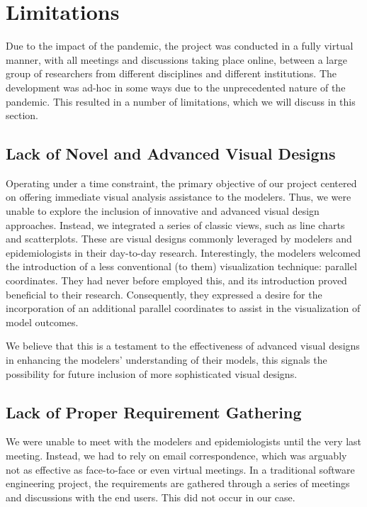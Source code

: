 \section{Limitations}

Due to the impact of the pandemic, the project was conducted in a fully virtual manner, with all meetings and discussions taking place online, between a large group of researchers from different disciplines and different institutions.
The development was ad-hoc in some ways due to the unprecedented nature of the pandemic.
This resulted in a number of limitations, which we will discuss in this section.

\subsection{Lack of Novel and Advanced Visual Designs}
Operating under a time constraint, the primary objective of our project centered on offering immediate visual analysis assistance to the modelers.
Thus, we were unable to explore the inclusion of innovative and advanced visual design approaches.
Instead, we integrated a series of classic views, such as line charts and scatterplots.
These are visual designs commonly leveraged by modelers and epidemiologists in their day-to-day research.
Interestingly, the modelers welcomed the introduction of a less conventional (to them) visualization technique: parallel coordinates.
They had never before employed this, and its introduction proved beneficial to their research.
Consequently, they expressed a desire for the incorporation of an additional parallel coordinates to assist in the visualization of model outcomes.

We believe that this is a testament to the effectiveness of advanced visual designs in enhancing the modelers' understanding of their models, this signals the possibility for future inclusion of more sophisticated visual designs.

\subsection{Lack of Proper Requirement Gathering}
We were unable to meet with the modelers and epidemiologists until the very last meeting. Instead, we had to rely on email correspondence, which was arguably not as effective as face-to-face or even virtual meetings.
In a traditional software engineering project, the requirements are gathered through a series of meetings and discussions with the end users. This did not occur in our case.

